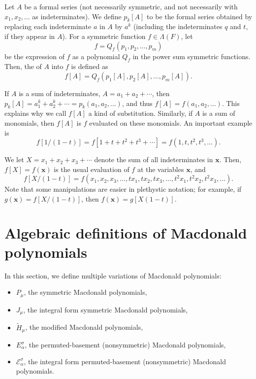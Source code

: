 Let \(A\) be a formal series (not necessarily symmetric, and not necessarily with \(x_1, x_2, \dots\) as indeterminates).
We define \(p_k[A]\) to be the formal series obtained by replacing each indeterminate \(a\) in \(A\) by \(a^k\) (including the indeterminates \(q\) and \(t\), if they appear in \(A\)).
For a symmetric function \(f \in \Lambda(F)\), let
\begin{equation*}
	f = Q_f(p_1, p_2, \ldots, p_m)
\end{equation*}
be the expression of \(f\) as a polynomial \(Q_f\) in the power sum symmetric functions.
Then, the  of \(A\) into \(f\) is defined as
\begin{equation*}
	f[A] = Q_f(p_1[A], p_2[A], \ldots, p_m[A]).
\end{equation*}

If \(A\) is a sum of indeterminates, \(A = a_1 + a_2 + \cdots\), then \(p_k[A] = a_1^k + a_2^k + \cdots = p_k(a_1, a_2, \ldots)\), and thus \(f[A] = f(a_1, a_2, \ldots)\).
This explains why we call \(f[A]\) a kind of substitution.
Similarly, if \(A\) is a sum of monomials, then \(f[A]\) is \(f\) evaluated on these monomials.
An important example is
\[
	f[1/(1-t)] = f[1 + t + t^2 + t^3 + \cdots] = f(1, t, t^2, t^3, \ldots).
\]

We let \(X = x_1 + x_2 + x_3 + \cdots\) denote the sum of all indeterminates in \(\mathbf{x}\).
Then, \(f[X] = f(\mathbf{x})\) is the usual evaluation of \(f\) at the variables \(\mathbf{x}\), and
\[
	f[X/(1-t)] = f(x_1, x_2, x_3, \ldots, t x_1, t x_2, t x_3, \ldots, t^2 x_1, t^2 x_2, t^2 x_3, \ldots ).
\]
Note that some manipulations are easier in plethystic notation;
for example, if \(g(\mathbf{x})  = f[X/(1-t)]\), then \(f(\mathbf{x}) = g[X(1-t)]\).

\section{Algebraic definitions of Macdonald polynomials}

In this section, we define multiple variations of Macdonald polynomials:
\begin{itemize}
	\item \(P_\mu\), the symmetric Macdonald polynomials,
	\item \(J_\mu\), the integral form symmetric Macdonald polynomials,
	\item \(\tilde{H}_\mu\), the modified Macdonald polynomials,
	\item \(E_\alpha^\sigma\), the permuted-basement (nonsymmetric) Macdonald polynomials,
	\item \(\mathcal{E}_\alpha^\sigma\), the integral form permuted-basement (nonsymmetric) Macdonald polynomials.
\end{itemize}

